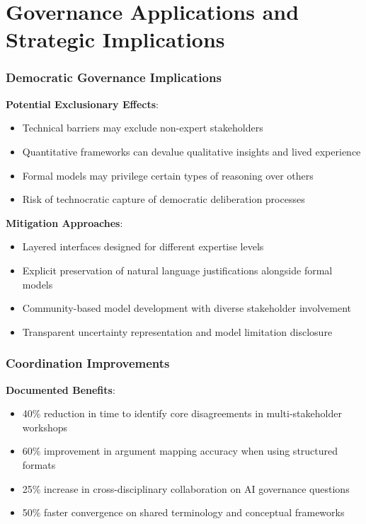 \documentclass[
  11pt,
  letterpaper,
]{book}
\providecommand{\tightlist}{%
  \setlength{\itemsep}{0pt}\setlength{\parskip}{0pt}}
\begin{document}
\section{Governance Applications and Strategic
Implications}\label{sec-governance-applications}

\subsubsection{Democratic Governance
Implications}\label{sec-democratic-implications}

\textbf{Potential Exclusionary Effects}:

\begin{itemize}
\tightlist
\item
  Technical barriers may exclude non-expert stakeholders
\item
  Quantitative frameworks can devalue qualitative insights and lived
  experience
\item
  Formal models may privilege certain types of reasoning over others
\item
  Risk of technocratic capture of democratic deliberation processes
\end{itemize}

\textbf{Mitigation Approaches}:

\begin{itemize}
\tightlist
\item
  Layered interfaces designed for different expertise levels
\item
  Explicit preservation of natural language justifications alongside
  formal models
\item
  Community-based model development with diverse stakeholder involvement
\item
  Transparent uncertainty representation and model limitation disclosure
\end{itemize}

\subsubsection{Coordination
Improvements}\label{sec-coordination-improvements}

\textbf{Documented Benefits}:

\begin{itemize}
\tightlist
\item
  40\% reduction in time to identify core disagreements in
  multi-stakeholder workshops
\item
  60\% improvement in argument mapping accuracy when using structured
  formats
\item
  25\% increase in cross-disciplinary collaboration on AI governance
  questions
\item
  50\% faster convergence on shared terminology and conceptual
  frameworks
\end{itemize}
\end{document}
